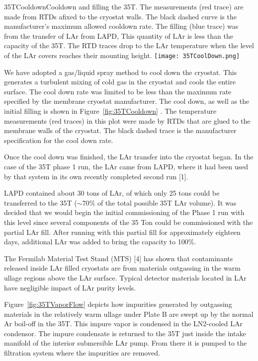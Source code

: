 
\begin{cdrfigure}{35TCooldown}{Cooldown and filling the 35T. The 
measurements (red trace) are made from RTDs afixed to the cryostat walls. The black dashed curve is the 
manufacturer's maximum allowed cooldown rate. The filling (blue trace) was from the transfer of LAr 
from LAPD, This quantity of LAr is less than the capacity of the 35T. The RTD traces drop to the LAr 
temperature when the level of the LAr covers reaches their mounting height.}
  \texttt{[image: 35TCoolDown.png]}
\end{cdrfigure}

We have adopted a gas/liquid spray method to cool down the cryostat. This generates a turbulent mixing 
of cold gas in the cryostat and cools the entire surface. The cool down rate was limited to be less than 
the maximum rate specified by the membrane cryostat manufacturer. The cool down, as well as the initial 
filling is shown in Figure~\ref{fig:35TCooldown} . The temperature measurements (red traces) in this plot 
were made by RTDs that are glued to the membrane walls of the cryostat. The black dashed trace is the 
manufacturer specification for the cool down rate.

Once the cool down was finished, the LAr transfer into the cryostat began. In the case of the 35T phase 1 
run, the LAr came from LAPD, where it had been used by that system in its own recently completed 
second run [1]\fixme{}. 

LAPD contained about 30 tons of LAr, of which only 25 tons could be transferred to the 35T ($\sim$70\% of 
the total possible 35T LAr volume). It was decided that we would begin the initial commissioning of the 
Phase 1 run with this level since several components of the 35 Ton could be commissioned with the 
partial LAr fill. After running with this partial fill for approximately eighteen days, additional LAr was 
added to bring the capacity to 100\%. 


The Fermilab Material Test Stand (MTS) [4]\fixme{} has shown that contaminants released inside LAr filled cryostats are from materials outgassing in the warm ullage regions above the LAr surface. Typical detector materials located in LAr have negligible impact of LAr purity levels. 

Figure~\ref{fig:35TVaporFlow} depicts how impurities generated by outgassing materials in the 
relatively warm ullage under Plate B are swept up by the normal Ar boil-off in the 35T. This impure vapor 
is condensed in the LN2-cooled LAr condensor. The impure condensate is returned to the 35T just inside 
the intake manifold of the interior submersible LAr pump. From there it is pumped to the filtration 
system where the impurities are removed.

